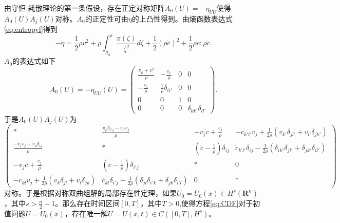 	由守恒-耗散理论的第一条假设，存在正定对称矩阵$A_0(U)  = -\eta_{UU}$使得$A_0(U) A_j(U)$对称。$A_0$的正定性可由$\eta$的上凸性得到。由熵函数表达式\eqref{eq:entropyf}得到
	\begin{equation*}
		-\eta = \frac{1}{2} \rho v^2 + \rho \int_{\rho_0}^\rho \frac{\pi(\zeta)}{\zeta^2} d \zeta + \frac{1}{2} (\rho \dot{c})^2 +　\frac{1}{2} \rho \mathring{c} : \rho \mathring{c}.
	\end{equation*}
	$A_0$的表达式如下
	\begin{equation*}
		A_0(U) = -\eta_{UU}(U) = \left(\begin{array}{cccc}
			\frac{\pi_\rho + v^2}{\rho} & -\frac{v_{i'}}{\rho} & 0 & 0\\
			-\frac{v_i} \rho & \frac{1}{\rho} \delta_{ii'} & 0 & 0\\ 
			0 & 0 & 1 & 0\\
			0 & 0 & 0 &\delta_{kk'} \delta_{ll'} 
		\end{array} \right).
	\end{equation*}
	于是$A_0(U) A_j(U)$为
	\begin{equation*}
		\left( \begin{smallmatrix} 
 		* & \frac{\pi_\rho \delta_{i'j} - v_{i'} v_j }{\rho} & -v_j \dot{c} + \frac{v_j}{\rho} &　-c_{k'l'} v_j + \frac{1}{2 \rho} (v_{k'} \delta_{jl'} + v_{l'} \delta_{jk'}) \\
 		\frac{-v_i v_j  + \pi_\rho \delta_{ij}}{\rho} & *   &  (\dot{c} - \frac{1}{\rho}) \delta_{ij} &  \mathring{c}_{k'l'} \delta_{ij}- \frac{1}{2 \rho}(\delta_{ik'}\delta_{jl'} + \delta_{jk'}\delta_{il'})  \\
 		- v_j \dot{c} + \frac{v_j}{\rho} & (\dot{c} - \frac{1}{\rho}) \delta_{i'j} &  * & 0 \\
 		-\mathring{c}_{kl} v_j + \frac{1}{2 \rho} (v_k \delta_{jl} + v_l \delta_{jk}) & \mathring{c}_{kl} \delta_{i'j}  - \frac{1}{2\rho} (\delta_{jl} \delta_{i'k} + \delta_{jk} \delta_{i'l}) & 0 & * 
 		\end{smallmatrix} \right)
	\end{equation*}
	对称。于是根据对称双曲组解的局部存在性定理，如果$U_0 =U_0(x) \in H^{s}(\mathbf{R}^n)$，其中$s>\frac{n}{2} +1$。那么存在时间区间$[0,T]$，其中$T>0$,使得方程\eqref{eq:CDF}对于初值问题$U=U_0(x)$，存在唯一解$U = U(x,t) \in C([0,T],H^s)$\cite{kato1975cauchy,majda2012compressible}。

